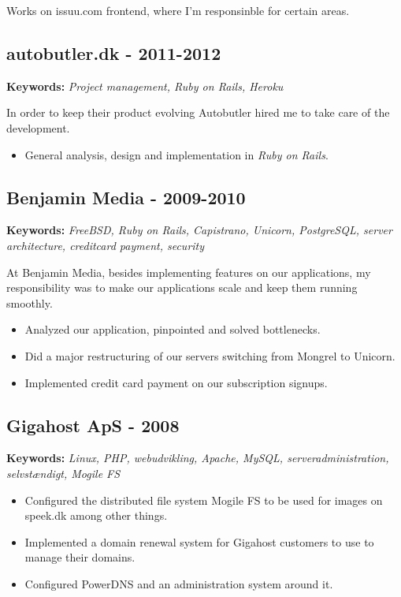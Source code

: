 \documentclass[a4paper]{article}
\newcommand{\keywords}[1]{\small\textbf{Keywords:} \emph{#1}\normalsize}
\begin{document}
Works on issuu.com frontend, where I'm responsinble for certain areas.

\subsection*{autobutler.dk - 2011-2012}
\keywords{Project management, Ruby on Rails, Heroku}

In order to keep their product evolving Autobutler hired me to take care of the development.

\begin{itemize}
	\item General analysis, design and implementation in \emph{Ruby on Rails}.
\end{itemize}

\subsection*{Benjamin Media - 2009-2010}

\keywords{FreeBSD, Ruby on Rails, Capistrano, Unicorn, PostgreSQL, server architecture, creditcard payment, security}

At Benjamin Media, besides implementing features on our applications, my responsibility was to make our applications scale and keep them running smoothly.

\begin{itemize}
	\item Analyzed our application, pinpointed and solved bottlenecks.
	\item Did a major restructuring of our servers switching from Mongrel to Unicorn.
	\item Implemented credit card payment on our subscription signups.
\end{itemize}

\subsection*{Gigahost ApS - 2008}

\keywords{Linux, PHP, webudvikling, Apache, MySQL, serveradministration, selvstændigt, Mogile FS}

\begin{itemize}
	\item Configured the distributed file system Mogile FS to be used for images on speek.dk among other things.
	\item Implemented a domain renewal system for Gigahost customers to use to manage their domains.
	\item Configured PowerDNS and an administration system around it.
\end{itemize}
\end{document}
